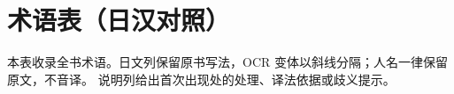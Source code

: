 
\chapter{术语表（日汉对照）}

\noindent
本表收录全书术语。日文列保留原书写法，OCR 变体以斜线分隔；人名一律保留原文，不音译。
说明列给出首次出现处的处理、译法依据或歧义提示。

\small
\renewcommand{\arraystretch}{1.15}
